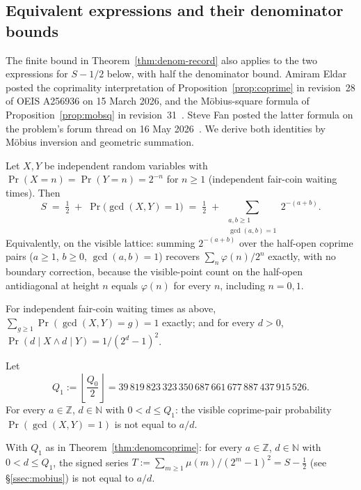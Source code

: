 \subsection{Equivalent expressions and their denominator bounds}
\label{ssec:coprime}

The finite bound in Theorem~\ref{thm:denom-record} also applies to the
two expressions for $S-1/2$ below, with half the denominator bound.
Amiram Eldar posted the coprimality interpretation of
Proposition~\ref{prop:coprime} in revision~28 of OEIS A256936 on
15 March 2026, and the M\"obius-square formula of
Proposition~\ref{prop:mobsq} in revision~31~\cite{eldar2026oeis}.
Steve Fan posted the latter formula on the problem's forum thread on
16 May 2026~\cite{fan2026totient}. We derive both identities by
M\"obius inversion and geometric summation.

\begin{prop}
\label{prop:coprime}
Let $X,Y$ be independent random variables with $\Pr(X=n)=\Pr(Y=n)=2^{-n}$
for $n \ge 1$ (independent fair-coin waiting times). Then
\[
S \;=\; \tfrac12 \;+\; \Pr\bigl(\gcd(X,Y)=1\bigr)
\;=\; \tfrac12 \;+\; \sum_{\substack{a,b\ge 1\\ \gcd(a,b)=1}} 2^{-(a+b)}.
\]
Equivalently, on the visible lattice: summing $2^{-(a+b)}$ over the half-open
coprime pairs ($a\ge1$, $b\ge0$, $\gcd(a,b)=1$) recovers $\sum_n \varphi(n)/2^n$
exactly, with no boundary correction, because the visible-point count on the
half-open antidiagonal at height $n$ equals $\varphi(n)$ for every $n$,
including $n=0,1$.
\end{prop}

\begin{prop}
\label{prop:gcdlayer}
For independent fair-coin waiting times as above, $\sum_{g\ge1}\Pr(\gcd(X,Y)=g)=1$
exactly; and for every $d>0$, $\Pr(d\mid X \wedge d\mid Y) = 1/(2^d-1)^2$.
\end{prop}

\begin{thm}
\label{thm:denomcoprime}
Let
\[
Q_1 := \left\lfloor \frac{Q_0}{2} \right\rfloor = 39\,819\,823\,323\,350\,687\,661\,677\,887\,437\,915\,526.
\]
For every $a\in\mathbb{Z}$, $d\in\mathbb{N}$ with $0<d\le Q_1$: the visible
coprime-pair probability $\Pr(\gcd(X,Y)=1)$ is not equal to $a/d$.
\end{thm}

\begin{thm}
\label{thm:denommobsq}
With $Q_1$ as in Theorem~\ref{thm:denomcoprime}: for every $a\in\mathbb{Z}$,
$d\in\mathbb{N}$ with $0<d\le Q_1$, the signed series
$T := \sum_{m\ge1} \mu(m)/(2^m-1)^2 = S - \tfrac12$ (see \S\ref{ssec:mobius})
is not equal to $a/d$.
\end{thm}

